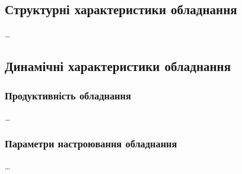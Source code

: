 \startAppendix

\label{add:project_design} 

\subsection{Структурні характеристики обладнання}
…

\subsection{Динамічні характеристики обладнання}
\subsubsection{Продуктивність обладнання}
…

\subsubsection{Параметри настроювання обладнання}
…